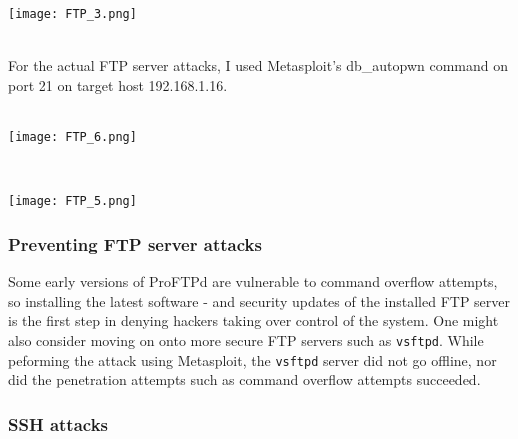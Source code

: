 \noindent\begin{minipage}{\textwidth}
    \centering
    \texttt{[image: FTP\_3.png]}
\end{minipage}
$\;$ \\ \\
For the actual FTP server attacks, I used Metasploit's db\_autopwn command on port 21 on target host 192.168.1.16. \\ \\
\noindent\begin{minipage}{\textwidth}
    \centering
    \texttt{[image: FTP\_6.png]}
\end{minipage}
$\;$ \\ \\
\noindent\begin{minipage}{\textwidth}
    \centering
    \texttt{[image: FTP\_5.png]}
\end{minipage}

\subsubsection{Preventing FTP server attacks}

Some early versions of ProFTPd are vulnerable to command overflow attempts, so installing the latest software - and security updates of the installed FTP server is the first step in denying hackers taking over control of the system. One might also consider moving on onto more secure FTP servers such as \texttt{vsftpd}. While peforming the attack using Metasploit, the \texttt{vsftpd} server did not go offline, nor did the penetration attempts such as command overflow attempts succeeded.

\subsubsection{SSH attacks}

